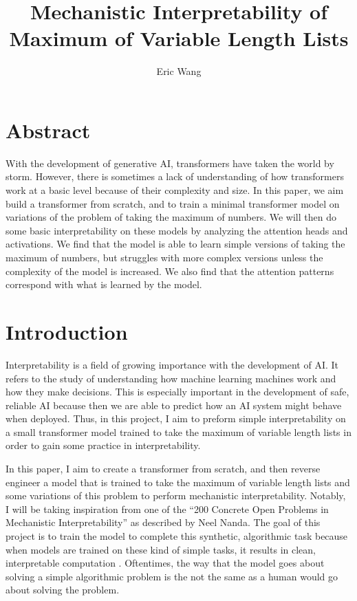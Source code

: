 \documentclass{article}
\title{Mechanistic Interpretability of Maximum of Variable Length Lists}
\author{Eric Wang}
\begin{document}
\maketitle

\section{Abstract}
With the development of generative AI, transformers have taken the world by storm. However, there is sometimes a lack of understanding of how transformers work at a basic level because of their complexity and size. In this paper, we aim build a transformer from scratch, and to train a minimal transformer model on variations of the problem of taking the maximum of numbers. We will then do some basic interpretability on these models by analyzing the attention heads and activations. We find that the model is able to learn simple versions of taking the maximum of numbers, but struggles with more complex versions unless the complexity of the model is increased. We also find that the attention patterns correspond with what is learned by the model. 

\section{Introduction}

Interpretability is a field of growing importance with the development of AI. It refers to the study of understanding how machine learning machines work and how they make decisions. This is especially important in the development of safe, reliable AI because then we are able to predict how an AI system might behave when deployed. Thus, in this project, I aim to preform simple interpretability on a small transformer model trained to take the maximum of variable length lists in order to gain some practice in interpretability.

In this paper, I aim to create a transformer from scratch, and then reverse engineer a model that is trained to take the maximum of variable length lists and some variations of this problem to perform mechanistic interpretability. Notably, I will be taking inspiration from one of the ``200 Concrete Open Problems in Mechanistic Interpretability'' as described by Neel Nanda. The goal of this project is to train the model to complete this synthetic, algorithmic task because when models are trained on these kind of simple tasks, it results in clean, interpretable computation \cite{1}. Oftentimes, the way that the model goes about solving a simple algorithmic problem is the not the same as a human would go about solving the problem. 
\end{document}
